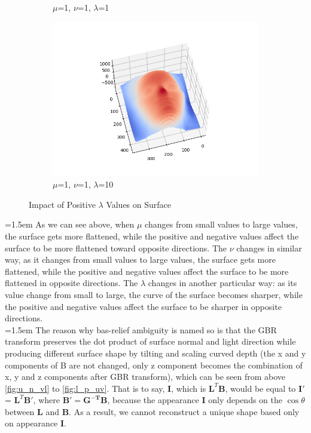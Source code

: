 \documentclass{article}
\begin{document}
\begin{figure}[H]
\begin{subfigure}{0.32\textwidth}
		\caption{$\mu$=1, $\nu$=1, $\lambda$=1}
	\end{subfigure}
	\hfill
	\begin{subfigure}{0.32\textwidth}
		\centering
		\includegraphics[width=\textwidth]{./src/2f_lambda_change/faceCalibrated_mu_1_v_1_lambda_10.png}
		\caption{$\mu$=1, $\nu$=1, $\lambda$=10}
	\end{subfigure}
	
	\caption{Impact of Positive $\lambda$ Values on Surface}
	\label{fig:l_p_uv}
\end{figure}
	\hangindent=1.5em \hspace{1.5em}As we can see above, when $\mu$ changes from small values to large values, the surface gets more flattened, while the positive and negative values affect the surface to be more flattened toward opposite directions. The $\nu$ changes in similar way, as it changes from small values to large values, the surface gets more flattened, while the positive and negative values affect the surface to be more flattened in opposite directions. The $\lambda$ changes in another particular way: as its value change from small to large, the curve of the surface becomes sharper, while the positive and negative values affect the surface to be sharper in opposite directions.\\
	\hangindent=1.5em \hspace{1.5em}The reason why bas-relief ambiguity is named so is that the GBR transform preserves the dot product of surface normal and light direction while producing different surface shape by tilting and scaling curved depth (the x and y components of B are not changed, only z component becomes the combination of x, y and z components after GBR transform), which can be seen from above \autoref{fig:u_n_vl} to \autoref{fig:l_p_uv}. That is to say, $\mathbf{I}$, which is $\mathbf{L}^T\mathbf{B}$, would be equal to $\mathbf{I'}$ = $\mathbf{L}^T\mathbf{B'}$, where $\mathbf{B'} = \mathbf{G^{-T}}\mathbf{B}$, because the appearance $\mathbf{I}$ only depends on the $\cos\theta$ between $\mathbf{L}$ and $\mathbf{B}$. As a result, we cannot reconstruct a unique shape based only on appearance $\mathbf{I}$.
	
\end{document}
